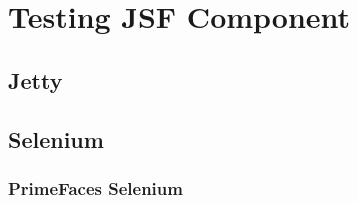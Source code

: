%

\chapter{Testing JSF Component}

\section{Jetty}

\section{Selenium}

\subsection{PrimeFaces Selenium}

